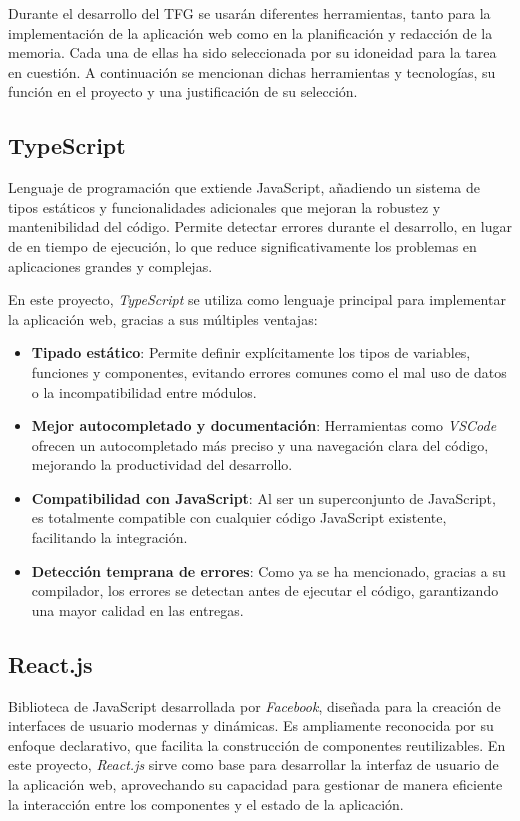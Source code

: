 Durante el desarrollo del TFG se usarán diferentes herramientas, tanto para la implementación de la aplicación web como en la planificación y redacción de la memoria. Cada una de ellas ha sido seleccionada por su idoneidad para la tarea en cuestión. A continuación se mencionan dichas herramientas y tecnologías, su función en el proyecto y una justificación de su selección.

\subsection{TypeScript}
Lenguaje de programación que extiende JavaScript, añadiendo un sistema de tipos estáticos y funcionalidades adicionales que mejoran la robustez y mantenibilidad del código. Permite detectar errores durante el desarrollo, en lugar de en tiempo de ejecución, lo que reduce significativamente los problemas en aplicaciones grandes y complejas.

En este proyecto, \textit{TypeScript} se utiliza como lenguaje principal para implementar la aplicación web, gracias a sus múltiples ventajas:
\begin{itemize}
    \item \textbf{Tipado estático}: Permite definir explícitamente los tipos de variables, funciones y componentes, evitando errores comunes como el mal uso de datos o la incompatibilidad entre módulos.
    \item \textbf{Mejor autocompletado y documentación}: Herramientas como \textit{VSCode} ofrecen un autocompletado más preciso y una navegación clara del código, mejorando la productividad del desarrollo.
    \item \textbf{Compatibilidad con JavaScript}: Al ser un superconjunto de JavaScript, es totalmente compatible con cualquier código JavaScript existente, facilitando la integración.
    \item \textbf{Detección temprana de errores}: Como ya se ha mencionado, gracias a su compilador, los errores se detectan antes de ejecutar el código, garantizando una mayor calidad en las entregas.
\end{itemize}

\subsection{React.js}
Biblioteca de JavaScript desarrollada por \textit{Facebook}, diseñada para la creación de interfaces de usuario modernas y dinámicas. Es ampliamente reconocida por su enfoque declarativo, que facilita la construcción de componentes reutilizables. En este proyecto, \textit{React.js} sirve como base para desarrollar la interfaz de usuario de la aplicación web, aprovechando su capacidad para gestionar de manera eficiente la interacción entre los componentes y el estado de la aplicación.

